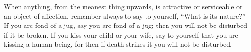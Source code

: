 When anything, from the meanest thing  upwards, is attractive or serviceable or
an  object of  affection, remember  always to  say to  yourself, ``What  is its
nature?'' If you  are fond of a jug, say  you are fond of a jug;  then you will
not be disturbed if  it be broken. If you kiss your child  or your wife, say to
yourself that you are  kissing a human being, for then if  death strikes it you
will not be disturbed.

